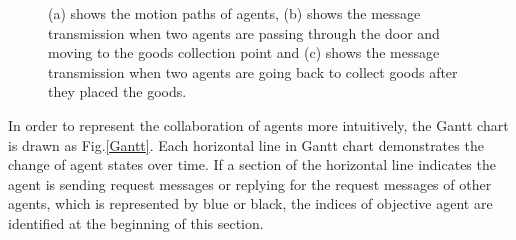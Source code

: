 \documentclass[journal]{IEEEtran}
\begin{document}
\begin{figure}
\centering
{}
\hspace{0.02cm}
\hspace{0.02cm}
\caption{(a) shows the motion paths of agents, (b) shows the message transmission when two agents are passing through the door and moving to the goods collection point and (c) shows the message transmission when two agents are going back to collect goods after they placed the goods.}
\label{second}
\end{figure}
In order to represent the collaboration of agents more intuitively, the Gantt chart is drawn as Fig.\ref{Gantt}. Each horizontal line in Gantt chart demonstrates the change of agent states over time. If a section of the horizontal line indicates the agent is sending request messages or replying for the request messages of other agents, which is represented by blue or black, the indices of objective agent are identified at the beginning of this section.
\end{document}

